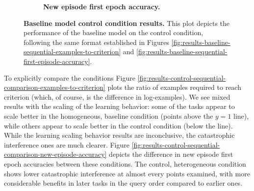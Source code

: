 \begin{figure}[!htb]
\begin{subfigure}{.49\textwidth}
    \caption{ {\bf New episode first epoch accuracy.}}
    \label{fig:results-control-sequential-first-episode-accuracy}
\end{subfigure}
\caption{{\bf Baseline model control condition results.} This plot depicts the performance of the baseline model on the control condition, following the same format established in Figures \ref{fig:results-baseline-sequential-examples-to-criterion} and \ref{fig:results-baseline-sequential-first-episode-accuracy}.}
\label{fig:results-control-absolute}
\vspace{-0.2in}
\end{figure}

To explicitly compare the conditions Figure \ref{fig:results-control-sequential-comparison-examples-to-criterion} plots the ratio of examples required to reach criterion (which, of course, is the difference in log-examples). We see mixed results with the scaling of the learning behavior: some of the tasks appear to scale better in the homogeneous, baseline condition (points above the $y=1$ line), while others appear to scale better in the control condition (below the line). While the learning scaling behavior results are inconclusive, the catastrophic interference ones are much clearer. Figure \ref{fig:results-control-sequential-comparison-new-episode-accuracy} depicts the difference in new episode first epoch accuracies between these conditions. The control, heterogeneous condition shows lower catastrophic interference at almost every points examined, with more considerable benefits in later tasks in the query order compared to earlier ones.  

